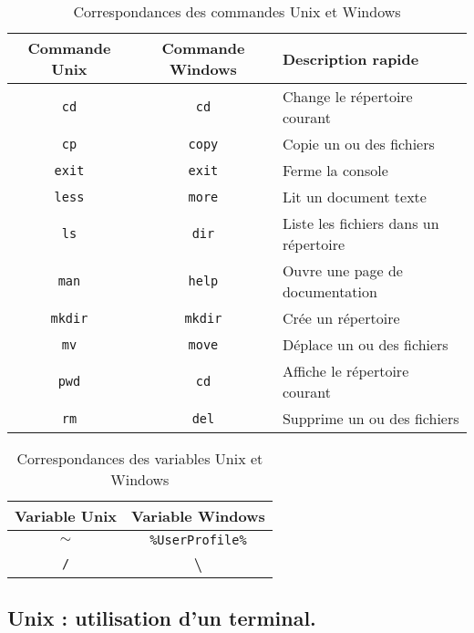 \begin{table}[!h]
  \begin{center}
  \begin{tabular}{|c|c|l|}
    \hline 
    Commande Unix & Commande Windows & Description rapide\\
    \hline
    \texttt{cd}    & \texttt{cd}      & Change le répertoire courant\\
    \hline
    \texttt{cp}    & \texttt{copy}    & Copie un ou des fichiers \\
    \hline
    \texttt{exit}  & \texttt{exit}    & Ferme la console \\
    \hline
    \texttt{less}  & \texttt{more}    & Lit un document texte \\
    \hline
    \texttt{ls}    & \texttt{dir}     & Liste les fichiers dans un répertoire \\
    \hline
    \texttt{man}   & \texttt{help}    & Ouvre une page de documentation \\
    \hline
    \texttt{mkdir} & \texttt{mkdir}   & Crée un répertoire\\
    \hline
    \texttt{mv}    & \texttt{move}    & Déplace un ou des fichiers \\
    \hline
    \texttt{pwd}   & \texttt{cd}      & Affiche le répertoire courant\\
    \hline
    \texttt{rm}    & \texttt{del}     & Supprime  un ou des fichiers \\
    \hline
  \end{tabular}
  \caption{Correspondances des commandes Unix et Windows}
  \label{TP02:tab:comlinwin}
  \end{center}
\end{table}

\begin{table}[!h]
  \begin{center}
  \begin{tabular}{|c|c|}
    \hline 
    Variable Unix & Variable Windows \\
    \hline
    $\sim$ & \texttt{\%UserProfile\%} \\
    \hline
    \texttt{/} & {\bf\textbackslash} \\
    \hline
  \end{tabular}
  \caption{Correspondances des variables Unix et Windows}
  \label{TP02:tab:varlinwin}
  \end{center}
\end{table}


\subsection{Unix : utilisation d'un terminal.}  \label{tp02:sec:unix1}

